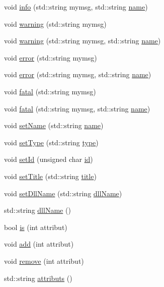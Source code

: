 \begin{DoxyCompactItemize}
\item 
void \hyperlink{classObject_a1ca123253dfd30fc28b156f521dcbdae}{info} (std\+::string mymsg, std\+::string \hyperlink{classObject_a300f4c05dd468c7bb8b3c968868443c1}{name})
\item 
void \hyperlink{classObject_a65cd4fda577711660821fd2cd5a3b4c9}{warning} (std\+::string mymsg)
\item 
void \hyperlink{classObject_a11f101db4dd73d9391b0231818881d86}{warning} (std\+::string mymsg, std\+::string \hyperlink{classObject_a300f4c05dd468c7bb8b3c968868443c1}{name})
\item 
void \hyperlink{classObject_a204a95f57818c0f811933917a30eff45}{error} (std\+::string mymsg)
\item 
void \hyperlink{classObject_ad7f6c457733082efa2f9ff5f5c8e119a}{error} (std\+::string mymsg, std\+::string \hyperlink{classObject_a300f4c05dd468c7bb8b3c968868443c1}{name})
\item 
void \hyperlink{classObject_aad5a16aac7516ce65bd5ec02ab07fc80}{fatal} (std\+::string mymsg)
\item 
void \hyperlink{classObject_ae62acd3d09f716220f75f252dc38bc9a}{fatal} (std\+::string mymsg, std\+::string \hyperlink{classObject_a300f4c05dd468c7bb8b3c968868443c1}{name})
\item 
void \hyperlink{classObject_ae30fea75683c2d149b6b6d17c09ecd0c}{set\+Name} (std\+::string \hyperlink{classObject_a300f4c05dd468c7bb8b3c968868443c1}{name})
\item 
void \hyperlink{classObject_aae534cc9d982bcb9b99fd505f2e103a5}{set\+Type} (std\+::string \hyperlink{classObject_a84f99f70f144a83e1582d1d0f84e4e62}{type})
\item 
void \hyperlink{classObject_a398fe08cba594a0ce6891d59fe4f159f}{set\+Id} (unsigned char \hyperlink{classObject_af99145335cc61ff6e2798ea17db009d2}{id})
\item 
void \hyperlink{classObject_a89557dbbad5bcaa02652f5d7fa35d20f}{set\+Title} (std\+::string \hyperlink{classObject_a73a0f1a41828fdd8303dd662446fb6c3}{title})
\item 
void \hyperlink{classObject_a870c5af919958c2136623b2d7816d123}{set\+Dll\+Name} (std\+::string \hyperlink{classObject_a2e3947f2870094c332d7454117f3ec63}{dll\+Name})
\item 
std\+::string \hyperlink{classObject_a2e3947f2870094c332d7454117f3ec63}{dll\+Name} ()
\item 
bool \hyperlink{classAttrib_a704f26af560909ad22065083bb7d4c34}{is} (int attribut)
\item 
void \hyperlink{classAttrib_a235f773af19c900264a190b00a3b4ad7}{add} (int attribut)
\item 
void \hyperlink{classAttrib_a7d4ef7e32d93cb287792b87b857e79f3}{remove} (int attribut)
\item 
std\+::string \hyperlink{classAttrib_aee7bbf16b144887f196e1341b24f8a26}{attributs} ()
\end{DoxyCompactItemize}
